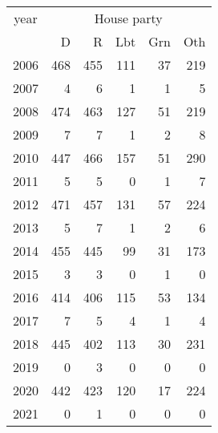 \footnotesize\begin{tabular}[t]{lrrrrr}
\toprule
\multicolumn{1}{c}{year} & \multicolumn{5}{c}{House party} \\
\cmidrule(l{3pt}r{3pt}){1-1} \cmidrule(l{3pt}r{3pt}){2-6}
  & D & R & Lbt & Grn & Oth\\
\midrule
2006 & 468 & 455 & 111 & 37 & 219\\
2007 & 4 & 6 & 1 & 1 & 5\\
2008 & 474 & 463 & 127 & 51 & 219\\
2009 & 7 & 7 & 1 & 2 & 8\\
2010 & 447 & 466 & 157 & 51 & 290\\
2011 & 5 & 5 & 0 & 1 & 7\\
2012 & 471 & 457 & 131 & 57 & 224\\
2013 & 5 & 7 & 1 & 2 & 6\\
2014 & 455 & 445 & 99 & 31 & 173\\
2015 & 3 & 3 & 0 & 1 & 0\\
2016 & 414 & 406 & 115 & 53 & 134\\
2017 & 7 & 5 & 4 & 1 & 4\\
2018 & 445 & 402 & 113 & 30 & 231\\
2019 & 0 & 3 & 0 & 0 & 0\\
2020 & 442 & 423 & 120 & 17 & 224\\
2021 & 0 & 1 & 0 & 0 & 0\\
\bottomrule
\end{tabular}

